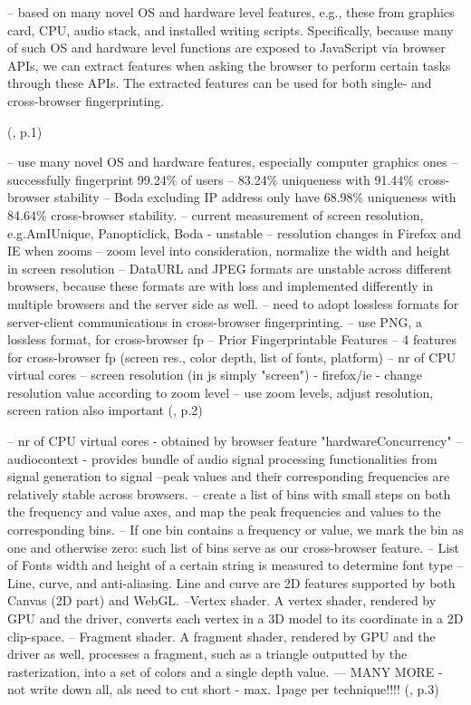-- based on many novel OS and hardware level features, e.g.,
these from graphics card, CPU, audio stack, and installed
writing scripts. Specifically, because many of such OS and
hardware level functions are exposed to JavaScript via browser
APIs, we can extract features when asking the browser to perform
certain tasks through these APIs. The extracted features
can be used for both single- and cross-browser fingerprinting.

(\textcite{Cao17}, p.1)

-- use many novel OS and hardware features, especially computer graphics ones
-- successfully fingerprint 99.24\% of users
-- 83.24\% uniqueness with 91.44\% cross-browser stability
-- Boda excluding IP address only have 68.98\% uniqueness with 84.64\% cross-browser stability.
--  current measurement of screen resolution, e.g.AmIUnique, Panopticlick, Boda - unstable
-- resolution changes in Firefox and IE when zooms
-- zoom level into consideration, normalize the width and height in screen resolution
-- DataURL and JPEG formats are unstable across different browsers, because these formats are with loss and implemented differently in multiple browsers and the server side as well.
-- need to adopt lossless formats for server-client communications in cross-browser fingerprinting.
-- use PNG, a lossless format, for cross-browser fp
-- Prior Fingerprintable Features
-- 4 features for cross-browser fp (screen res., color depth, list of fonts, platform)
-- nr of CPU virtual cores
-- screen resolution (in js simply "screen") - firefox/ie - change resolution value according to zoom level
-- use zoom levels, adjust resolution, screen ration also important
(\textcite{Cao17}, p.2)

-- nr of CPU virtual cores - obtained by browser feature "hardwareConcurrency"
-- audiocontext - provides bundle of audio signal processing functionalities from signal generation to signal
--peak values and their corresponding frequencies are relatively stable
across browsers. 
-- create a list of bins with small steps on both the frequency and value axes, and map the peak
frequencies and values to the corresponding bins.
-- If one bin contains a frequency or value, we mark the bin as one and
otherwise zero: such list of bins serve as our cross-browser feature.
-- List of Fonts width and height of a certain string is measured to determine font type
-- Line, curve, and anti-aliasing. Line and curve are 2D features
supported by both Canvas (2D part) and WebGL.
--Vertex shader. A vertex shader, rendered by GPU and the
driver, converts each vertex in a 3D model to its coordinate in
a 2D clip-space.
-- Fragment shader. A fragment shader, rendered by GPU and
the driver as well, processes a fragment, such as a triangle
outputted by the rasterization, into a set of colors and a single
depth value.
--- MANY MORE - not write down all, als need to cut short - max. 1page per technique!!!!
(\textcite{Cao17}, p.3)


